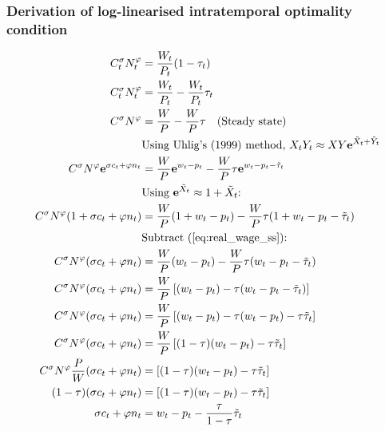 \subsubsection{Derivation of log-linearised intratemporal optimality condition}
\begin{align}
    C_t^\sigma N_t^\varphi &= \frac{W_t}{P_t}(1-\tau_t) \\
    C_t^\sigma N_t^\varphi &= \frac{W_t}{P_t} - \frac{W_t}{P_t}\tau_t \\
    C^\sigma N^\varphi &= \frac{W}{P} - \frac{W}{P}\tau \label{eq:real_wage_ss} \quad \text{(Steady state)}\\
    &\text{Using Uhlig's (1999) method, $X_tY_t \approx XY\mathbf{e}^{\tilde{X}_t + \tilde{Y}_t}$}\nonumber\\
    C^\sigma N^\varphi\mathbf{e}^{\sigma c_t + \varphi n_t} &= \frac{W}{P}\mathbf{e}^{w_t - p_t} - \frac{W}{P}\tau \mathbf{e}^{w_t - p_t - \tilde{\tau}_t}\\
    &\text{Using $\mathbf{e}^{\tilde{X}_t} \approx 1 + {\tilde{X}_t}$: }\nonumber\\
    C^\sigma N^\varphi({1+\sigma c_t + \varphi n_t}) &= \frac{W}{P}({1+ w_t - p_t}) - \frac{W}{P}\tau ({1+ w_t - p_t - \tilde{\tau}_t})\\
    &\text{Subtract (\ref{eq:real_wage_ss}): } \nonumber\\
    C^\sigma N^\varphi({\sigma c_t + \varphi n_t}) &= \frac{W}{P}({w_t - p_t}) - \frac{W}{P}\tau ({w_t - p_t - \tilde{\tau}_t})\\
    C^\sigma N^\varphi({\sigma c_t + \varphi n_t}) &= \frac{W}{P}\left[({w_t - p_t}) - \tau ({w_t - p_t - \tilde{\tau}_t})\right]\\
    C^\sigma N^\varphi({\sigma c_t + \varphi n_t}) &= \frac{W}{P}\left[({w_t - p_t}) - \tau ({w_t - p_t}) - \tau \tilde{\tau}_t\right]\\
    C^\sigma N^\varphi({\sigma c_t + \varphi n_t}) &= \frac{W}{P}\left[(1-\tau)({w_t - p_t}) - \tau \tilde{\tau}_t\right]\\
    C^\sigma N^\varphi \frac{P}{W} ({\sigma c_t + \varphi n_t})  &= \left[(1-\tau)({w_t - p_t}) - \tau \tilde{\tau}_t\right]\\
    (1-\tau)({\sigma c_t + \varphi n_t})  &= \left[(1-\tau)({w_t - p_t}) - \tau \tilde{\tau}_t\right]  \label{eq:intratemporal_loglinear_final_step} \\
    {\sigma c_t + \varphi n_t}  &= {w_t - p_t} - \frac{\tau}{1-\tau}\tilde{\tau}_t
\end{align}
\newpage